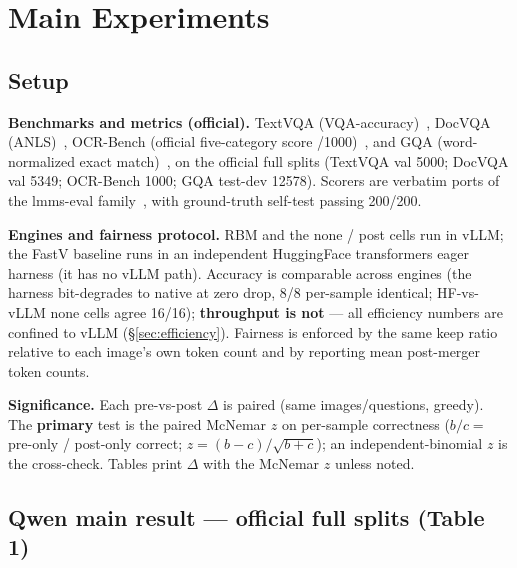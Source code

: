 \documentclass[sigconf,review,anonymous]{acmart}
\begin{document}
\section{Main Experiments}\label{sec:experiments}

\subsection{Setup}\label{sec:setup}

\textbf{Benchmarks and metrics (official).} TextVQA
(VQA-accuracy)~\cite{singh2019textvqa}, DocVQA (ANLS)~\cite{mathew2021docvqa},
OCR-Bench (official five-category score /1000)~\cite{liu2024ocrbench}, and GQA
(word-normalized exact match)~\cite{hudson2019gqa}, on the official full splits
(TextVQA val 5000; DocVQA val 5349; OCR-Bench 1000; GQA test-dev 12578). Scorers
are verbatim ports of the lmms-eval family~\cite{zhang2024lmmseval}, with
ground-truth self-test passing 200/200.

\textbf{Engines and fairness protocol.} RBM and the none / post cells run in
vLLM; the FastV baseline runs in an independent HuggingFace transformers eager
harness (it has no vLLM path). Accuracy is comparable across engines (the harness
bit-degrades to native at zero drop, 8/8 per-sample identical; HF-vs-vLLM none
cells agree 16/16); \textbf{throughput is not} --- all efficiency numbers are
confined to vLLM (\S\ref{sec:efficiency}). Fairness is enforced by the same keep
ratio relative to each image's own token count and by reporting mean
post-merger token counts.

\textbf{Significance.} Each pre-vs-post $\Delta$ is paired (same
images/questions, greedy). The \textbf{primary} test is the paired McNemar $z$
on per-sample correctness ($b/c =$ pre-only / post-only correct;
$z = (b - c)/\sqrt{b + c}$); an independent-binomial $z$ is the cross-check.
Tables print $\Delta$ with the McNemar $z$ unless noted.

\subsection{Qwen main result --- official full splits (Table 1)}\label{sec:qwen}
\end{document}
